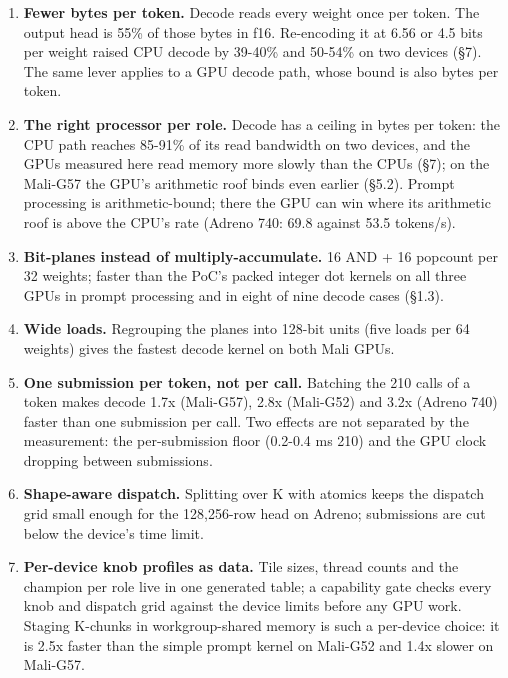 \documentclass[
  10pt,
]{article}
\providecommand{\tightlist}{%
  \setlength{\itemsep}{0pt}\setlength{\parskip}{0pt}}
\begin{document}
\begin{enumerate}
\def\labelenumi{\arabic{enumi}.}
\tightlist%
\item
  \textbf{Fewer bytes per token.} Decode reads every weight once per
  token. The output head is 55\% of those bytes in f16. Re-encoding it
  at 6.56 or 4.5 bits per weight raised CPU decode by 39-40\% and
  50-54\% on two devices (\S{}7). The same lever applies to a GPU decode
  path, whose bound is also bytes per token.
\item
  \textbf{The right processor per role.} Decode has a ceiling in bytes
  per token: the CPU path reaches 85-91\% of its read bandwidth on two
  devices, and the GPUs measured here read memory more slowly than the
  CPUs (\S{}7); on the Mali-G57 the GPU's arithmetic roof binds even
  earlier (\S{}5.2). Prompt processing is arithmetic-bound; there the
  GPU can win where its arithmetic roof is above the CPU's rate (Adreno
  740: 69.8 against 53.5 tokens/s).
\item
  \textbf{Bit-planes instead of multiply-accumulate.} 16 AND + 16
  popcount per 32 weights; faster than the PoC's packed integer dot
  kernels on all three GPUs in prompt processing and in eight of nine
  decode cases (\S{}1.3).
\item
  \textbf{Wide loads.} Regrouping the planes into 128-bit units (five
  loads per 64 weights) gives the fastest decode kernel on both Mali
  GPUs.
\item
  \textbf{One submission per token, not per call.} Batching the 210
  calls of a token makes decode 1.7x (Mali-G57), 2.8x (Mali-G52) and
  3.2x (Adreno 740) faster than one submission per call. Two effects are
  not separated by the measurement: the per-submission floor (0.2-0.4 ms
  \texttimes{} 210) and the GPU clock dropping between submissions.
\item
  \textbf{Shape-aware dispatch.} Splitting over K with atomics keeps the
  dispatch grid small enough for the 128,256-row head on Adreno;
  submissions are cut below the device's time limit.
\item
  \textbf{Per-device knob profiles as data.} Tile sizes, thread counts
  and the champion per role live in one generated table; a capability
  gate checks every knob and dispatch grid against the device limits
  before any GPU work. Staging K-chunks in workgroup-shared memory is
  such a per-device choice: it is 2.5x faster than the simple prompt
  kernel on Mali-G52 and 1.4x slower on Mali-G57.
\end{enumerate}
\end{document}
